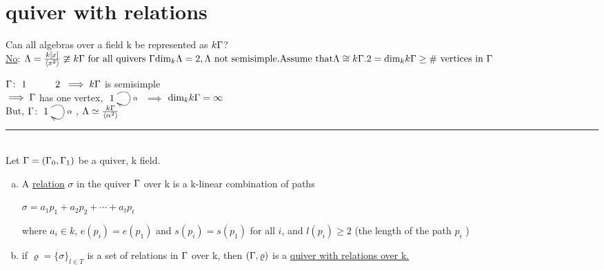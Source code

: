 \section{quiver with relations}
Can all algebras over a field k be represented as $k\Gamma$?\\\newline
\underline{No}: 
$\Lambda = \frac{k[x]}{\langle x^2\rangle} \ncong k\G \text{ for all quivers }\G
\text{dim}_{k}\Lambda = 2, \Lambda\text{ not semisimple}.\\\newline \text{Assume that}  \Lambda \cong k\G.\\
2= \text{dim}_kk\G \ge \text{\# vertices in } \G $

$ \G \colon \xymatrix{1& 2} \implies k\G$ is semisimple \blitza\\
$\implies \Gamma$ has one vertex, $\xymatrix{1\ar@(ur,dr)^\alpha} $ $\implies$ $\text{dim}_kk\Gamma = \infty$ \blitza\\
\newline But, $\G\colon \xymatrix{1 \ar@(ur,dr)^\alpha}$, $\Lambda \simeq \frac{k\Gamma}{\langle \alpha^2\rangle} $\\
\rule{\textwidth}{1pt}\\
Let $\Gamma=(\Gamma_0,\Gamma_1)$ be a quiver, k field.\\
\begin{defin}
\begin{enumerate}[(a)]
	~\\ \item A \underline{relation} $\sigma$ in the quiver $\Gamma$ over k is a k-linear combination of paths
	\begin{center}
		$\sigma = a_1p_1 + a_2p_2+ \cdots + a_tp_t$\\
	\end{center}
	where $a_i\in k$, $e(p_i)=e(p_1)$ and $s(p_i)=s(p_1)$ for all $i$, and $l(p_i)\geq 2$ (the length of the path $p_i$ )
	\item if $\varrho = \{\sigma\}_{l \in T}$ is a set of relations in $\Gamma$ over k, then $(\Gamma,\varrho)$ is a \underline{quiver with relations over k.}  
\end{enumerate}
\end{defin}
